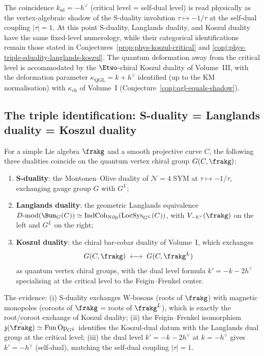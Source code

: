 \begin{remark}
\label{rem:phys-self-dual-level}
The coincidence $k_{\mathrm{sd}} = -h^\vee$ (critical level = self-dual level)
is read physically as the vertex-algebraic shadow of the S-duality involution
$\tau \mapsto -1/\tau$ at the self-dual coupling $|\tau| = 1$. At this point
S-duality, Langlands duality, and Koszul duality have the same fixed-level
numerology, while their categorical identifications remain those stated in
Conjectures~\ref{prop:phys-koszul-critical} and
\ref{conj:phys-triple-sduality-langlands-koszul}. The quantum deformation away
from the critical level is accommodated by the $\Etwo$-chiral
Koszul duality of Volume~III, with the deformation parameter
$\kappa_{\mathrm{QGL}} = k + h^\vee$ identified (up to the KM normalisation)
with $\kappa_{\mathrm{ch}}$ of Volume~I (Conjecture~\ref{conj:qgl-equals-shadow}).
\end{remark}

\subsection{The triple identification: S-duality = Langlands duality = Koszul duality}
\label{subsec:phys-triple-id}

\begin{conjecture}
\label{conj:phys-triple-sduality-langlands-koszul}
\ClaimStatusConjectured
For a simple Lie algebra $\frakg$ and a smooth projective curve $C$, the
following three dualities coincide on the quantum vertex chiral group $G(C,\frakg)$:
\begin{enumerate}[label=(\roman*)]
\item \textbf{S-duality}: the Montonen--Olive duality of $\mathcal{N}=4$ SYM at
 $\tau \mapsto -1/\tau$, exchanging gauge group $G$ with $G^L$;
\item \textbf{Langlands duality}: the geometric Langlands equivalence
 $D\text{-}\mathrm{mod}(\Bun_G(C)) \simeq \mathrm{IndCoh}_{\mathrm{Nilp}}(\mathrm{LocSys}_{G^L}(C))$,
 with $V_{-h^\vee}(\frakg)$ on the left and $G^L$ on the right;
\item \textbf{Koszul duality}: the chiral bar-cobar duality of Volume~I,
 which exchanges
 \[
 G(C,\frakg) \;\longleftrightarrow\; G(C,\frakg^L)
 \]
 as quantum vertex chiral groups, with the dual level formula
 $k' = -k - 2h^\vee$ specialising at the critical level to the
 Feigin--Frenkel center.
\end{enumerate}
The evidence: (i) S-duality exchanges W-bosons (roots of $\frakg$) with
magnetic monopoles (coroots of $\frakg$ = roots of $\frakg^L$), which is
exactly the root/coroot exchange of Koszul duality; (ii) the Feigin--Frenkel
isomorphism $\mathfrak{z}(\hat{\frakg}) \simeq \mathrm{Fun}\,\mathrm{Op}_{G^L}$
identifies the Koszul-dual datum with the Langlands dual group at the critical
level; (iii) the dual level $k' = -k - 2h^\vee$ at $k = -h^\vee$ gives
$k' = -h^\vee$ (self-dual), matching the self-dual coupling $|\tau| = 1$.
\end{conjecture}

